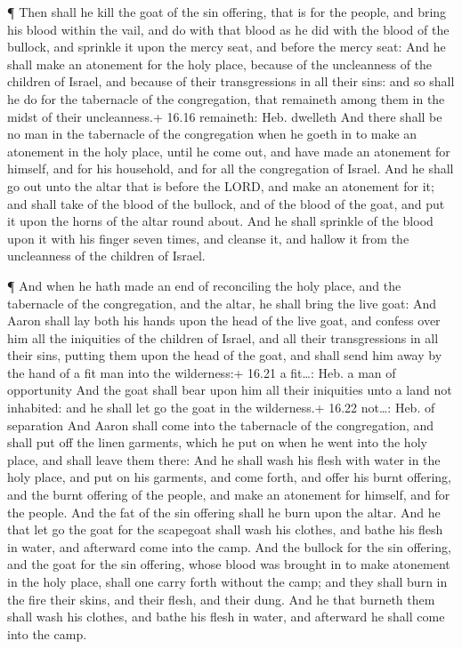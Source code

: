  ¶ Then shall he kill the goat of the sin offering, that is
for the people, and bring his blood within the vail, and do with that
blood as he did with the blood of the bullock, and sprinkle it upon the
mercy seat, and before the mercy seat:  And he shall make
an atonement for the holy place, because of the uncleanness of the
children of Israel, and because of their transgressions in all their
sins: and so shall he do for the tabernacle of the congregation, that
remaineth among them in the midst of their uncleanness.+ 16.16
remaineth: Heb. dwelleth  And there shall be no man in the
tabernacle of the congregation when he goeth in to make an atonement in
the holy place, until he come out, and have made an atonement for
himself, and for his household, and for all the congregation of Israel.
 And he shall go out unto the altar that is before the
LORD, and make an atonement for it; and shall take of the blood of the
bullock, and of the blood of the goat, and put it upon the horns of the
altar round about.  And he shall sprinkle of the blood upon
it with his finger seven times, and cleanse it, and hallow it from the
uncleanness of the children of Israel.

 ¶ And when he hath made an end of reconciling the holy
place, and the tabernacle of the congregation, and the altar, he shall
bring the live goat:  And Aaron shall lay both his hands
upon the head of the live goat, and confess over him all the iniquities
of the children of Israel, and all their transgressions in all their
sins, putting them upon the head of the goat, and shall send him away by
the hand of a fit man into the wilderness:+ 16.21 a fit\ldots: Heb. a
man of opportunity  And the goat shall bear upon him all
their iniquities unto a land not inhabited: and he shall let go the goat
in the wilderness.+ 16.22 not\ldots: Heb. of separation 
And Aaron shall come into the tabernacle of the congregation, and shall
put off the linen garments, which he put on when he went into the holy
place, and shall leave them there:  And he shall wash his
flesh with water in the holy place, and put on his garments, and come
forth, and offer his burnt offering, and the burnt offering of the
people, and make an atonement for himself, and for the people.
 And the fat of the sin offering shall he burn upon the
altar.  And he that let go the goat for the scapegoat shall
wash his clothes, and bathe his flesh in water, and afterward come into
the camp.  And the bullock for the sin offering, and the
goat for the sin offering, whose blood was brought in to make atonement
in the holy place, shall one carry forth without the camp; and they
shall burn in the fire their skins, and their flesh, and their dung.
 And he that burneth them shall wash his clothes, and bathe
his flesh in water, and afterward he shall come into the camp.

